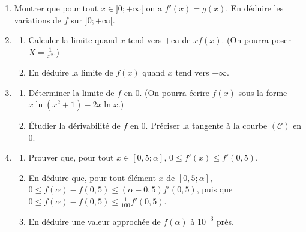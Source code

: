 \begin{exo}
\begin{description}
\begin{enumerate}
                  \end{enumerate}
            \item[Partie B :]
                  \begin{enumerate}
                        \item Montrer que pour tout $x\in ]0 ; +\infty[$ on a $f'(x) = g(x)$.
                              En d\'eduire les variations de $f$ sur $]0 ; +\infty[$.
                        \item \begin{enumerate}
                                    \item Calculer la limite quand $x$ tend vers $+\infty$ de $x f(x)$.
                                          (On pourra poser $X = \frac{1}{x^2}$.)
                                    \item En d\'eduire la limite de $f(x)$ quand $x$ tend vers $+\infty$.
                              \end{enumerate}
                        \item \begin{enumerate}
                                    \item D\'eterminer la limite de $f$ en $0$.
                                          (On pourra \'ecrire $f(x)$ sous la forme $ x \ln (x^2+1) - 2 x \ln x$.)
                                    \item \'Etudier la d\'erivabilit\'e de $f$ en $0$.
                                          Pr\'eciser la tangente \`a la courbe $(\mathscr{C})$ en $0$.
                              \end{enumerate}
                        \item \begin{enumerate}
                                    \item Prouver que, pour tout $x \in [ 0,5 ; \alpha ]$,
                                          $ 0 \leq f'(x) \leq f'(0,5)$.
                                    \item En d\'eduire que, pour tout \'el\'ement $x$ de $[0,5 ; \alpha]$, 
                                          $0 \leq f(\alpha) - f(0,5) \leq (\alpha - 0,5) f'(0,5)$,
                                          puis que 
                                          $0 \leq f(\alpha) - f(0,5) \leq \frac{1}{100} f'(0,5)$.
                                    \item En d\'eduire une valeur approch\'ee de $f(\alpha)$ \`a $10^{-3}$ pr\`es.
                              \end{enumerate}

\end{enumerate}
\end{description}
\end{exo}
